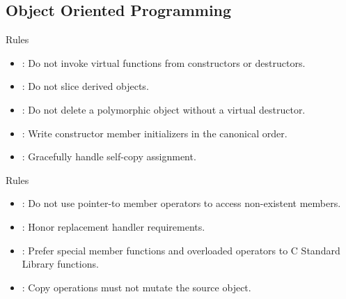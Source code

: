 \subsection{Object Oriented Programming}

\begin{frame}[t]{Rules}
\begin{itemize}
  \item {}: 
        Do not invoke virtual functions from constructors or destructors.
  \vfill
  \item {}: 
        Do not slice derived objects.
  \vfill
  \item {}: 
        Do not delete a polymorphic object without a virtual destructor.
  \vfill
  \item {}: 
        Write constructor member initializers in the canonical order.
  \vfill
  \item {}: 
        Gracefully handle self-copy assignment.
\end{itemize}
\end{frame}

\begin{frame}[t]{Rules}
\begin{itemize}
  \item {}: 
        Do not use pointer-to member operators to access non-existent members.
  \vfill
  \item {}: 
        Honor replacement handler requirements.
  \vfill
  \item {}: 
        Prefer special member functions and overloaded operators to C Standard Library functions.
  \vfill
  \item {}: 
        Copy operations must not mutate the source object.
\end{itemize}
\end{frame}


